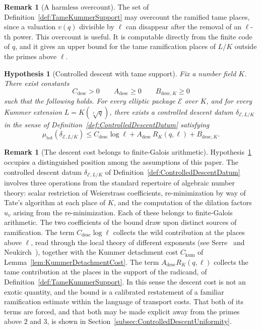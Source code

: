 \documentclass[10pt, reqno]{amsart}
\theoremstyle{plain}
\theoremstyle{definition}
\newtheorem{remark}[theorem]{Remark}
\theoremstyle{plain}
\newtheorem{hypothesis}[theorem]{Hypothesis}
\begin{document}
\begin{remark}[A harmless overcount]\label{rem:TameSupportOvercount}
The set of Definition~\ref{def:TameKummerSupport} may overcount the ramified tame places, since a valuation $v(q)$ divisible by $\ell$ can disappear after the removal of an $\ell$-th power. This overcount is useful. It is computable directly from the finite code of $q$, and it gives an upper bound for the tame ramification places of $L/K$ outside the primes above $\ell$.
\end{remark}

\begin{hypothesis}[Controlled descent with tame support]\label{hyp:ControlledDescentWithSupport}
Fix a number field $K$. There exist constants
\[
  C_{\mathrm{desc}}>0
  \qquad
  A_{\mathrm{desc}}\ge 0
  \qquad
  B_{\mathrm{desc},K}\ge 0
\]
such that the following holds. For every elliptic package $\mathcal{E}$ over $K$, and for every Kummer extension $L=K(\sqrt[\ell]{q})$, there exists a controlled descent datum $\delta_{\mathcal{E},L/K}$ in the sense of Definition~\ref{def:ControlledDescentDatum} satisfying
\begin{equation}\label{eq:ControlledDescentWithSupport}
  \mu_{\mathrm{tot}}(\delta_{\mathcal{E},L/K})
  \le
  C_{\mathrm{desc}}\log \ell
  +
  A_{\mathrm{desc}}\,R_{K}(q,\ell)
  +
  B_{\mathrm{desc},K}.
\end{equation}
\end{hypothesis}

\begin{remark}[The descent cost belongs to finite-Galois arithmetic]\label{rem:DescentCostClassicalNature}
Hypothesis~\ref{hyp:ControlledDescentWithSupport} occupies a distinguished position among the assumptions of this paper. The controlled descent datum $\delta_{\mathcal{E},L/K}$ of Definition~\ref{def:ControlledDescentDatum} involves three operations from the standard repertoire of algebraic number theory: scalar restriction of Weierstrass coefficients, re-minimization by way of Tate's algorithm at each place of $K$, and the computation of the dilation factors $u_v$ arising from the re-minimization. Each of these belongs to finite-Galois arithmetic. The two coefficients of the bound draw upon distinct sources of ramification. The term $C_{\mathrm{desc}}\log \ell$ collects the wild contribution at the places above $\ell$, read through the local theory of different exponents (see Serre~\cite{Serre1979} and Neukirch~\cite{Neukirch1999}), together with the Kummer detachment cost $C_{\mathrm{kum}}$ of Lemma~\ref{lem:KummerDetachmentCost}. The term $A_{\mathrm{desc}}R_{K}(q,\ell)$ collects the tame contribution at the places in the support of the radicand, of Definition~\ref{def:TameKummerSupport}. In this sense the descent cost is not an exotic quantity, and the bound is a calibrated restatement of a familiar ramification estimate within the language of transport costs. That both of its terms are forced, and that both may be made explicit away from the primes above $2$ and $3$, is shown in Section~\ref{subsec:ControlledDescentUniformity}.
\end{remark}
\end{document}
